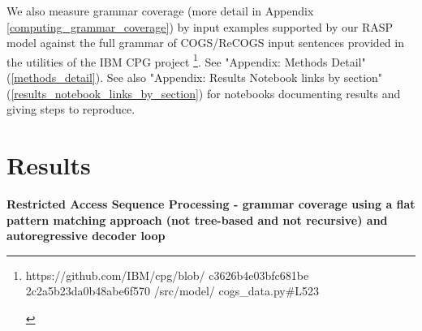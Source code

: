 \documentclass[11pt]{article}
\begin{document}
We also measure grammar coverage \cite{fuzzingbook2023:GrammarCoverageFuzzer} (more detail in Appendix \ref{computing_grammar_coverage}) by input examples supported by our RASP model against the full grammar of COGS/ReCOGS input sentences provided in the utilities of the IBM CPG project \cite{klinger2024compositionalprogramgenerationfewshot}\footnote{\begin{footnotesize}https://github.com/IBM/cpg/blob/
c3626b4e03bfc681be
2c2a5b23da0b48abe6f570
/src/model/
cogs\_data.py\#L523 
\end{footnotesize}
}. See "Appendix: Methods Detail" (\ref{methods_detail}). See also "Appendix: Results Notebook links by section" (\ref{results_notebook_links_by_section}) for notebooks documenting results and giving steps to reproduce.
\section{Results}
\textbf{Restricted Access Sequence Processing - grammar coverage using a flat pattern matching approach (not tree-based and not recursive) and autoregressive decoder loop}
\end{document}
